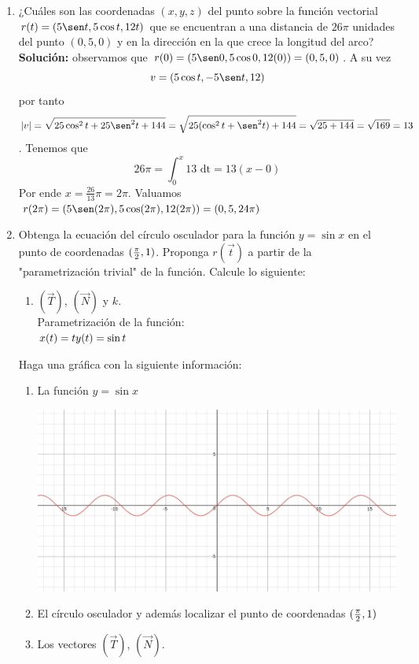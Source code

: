 \documentclass[10pt,letterpaper,fleqn]{article}
\begin{document}
\begin{enumerate}
        \item ¿Cuáles son las coordenadas $(x,y,z)$ del punto sobre la función vectorial $r(t)=(5\sen t,5\cos t, 12t)$
        que se encuentran a una distancia de $26\pi$ unidades del punto $(0,5,0)$ y en la dirección en la que crece
        la longitud del arco?\\
        \textbf{Solución:} observamos que $r(0) =(5\sen 0, 5\cos 0, 12(0)) = (0,5,0)$. A su vez $$v = (5\cos t,-5\sen t, 12)$$ 
        por tanto $$|v| = \sqrt{25\cos^2 t + 25\sen^2 t + 144} = \sqrt{25(\cos^2 t + \sen^2 t) + 144} = \sqrt{25+144} = \sqrt{169} = 13$$.
        Tenemos que $$26\pi = \int_{0}^{x}13 \text{ dt} = 13(x - 0)$$ Por ende $x = \frac{26}{13}\pi = 2\pi$. 
        Valuamos $r(2\pi) = (5\sen (2\pi), 5\cos (2\pi), 12(2\pi)) = (0,5,24\pi)$

        \item Obtenga la ecuación del círculo osculador para la función $y=\sin x$ en el punto de coordenadas $({\pi \over 2},1)$. Proponga $r(\overrightarrow{t})$ a partir de la "parametrización trivial" de la función. Calcule lo siguiente: 
        \begin{enumerate}
            \item $(\overrightarrow{T})$, $(\overrightarrow{N})$ y $k$.\\
            Parametrización de la función: \\
            $x(t) = t \\
             y(t) = \sin t$
        \end{enumerate}
        Haga una gráfica con la siguiente información:
        \begin{enumerate}
            \item La función $y=\sin x$ \\
            \begin{center}
                \includegraphics[scale=.3]{assets/img/ejercicio8(b).png}
            \end{center}
            \item El círculo osculador y además localizar el punto de coordenadas $({\pi \over 2},1)$
            \item Los vectores $(\overrightarrow{T})$, $(\overrightarrow{N})$.
        \end{enumerate}


\end{enumerate}
\end{document}
